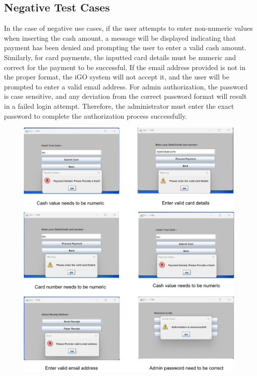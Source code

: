 \documentclass[a4paper, 11pt]{report}
\begin{document}
\subsection{Negative Test Cases}
In the case of negative use cases, if the user attempts to enter non-numeric values when inserting the cash amount, a message will be displayed indicating that payment has been denied and prompting the user to enter a valid cash amount. Similarly, for card payments, the inputted card details must be numeric and correct for the payment to be successful. If the email address provided is not in the proper format, the iGO system will not accept it, and the user will be prompted to enter a valid email address. For admin authorization, the password is case sensitive, and any deviation from the correct password format will result in a failed login attempt. Therefore, the administrator must enter the exact password to complete the authorization process successfully.\\
\begin{figure}[h]
\centering
   \includegraphics[width=14cm]{6.png} 
\end{figure}
\end{document}
